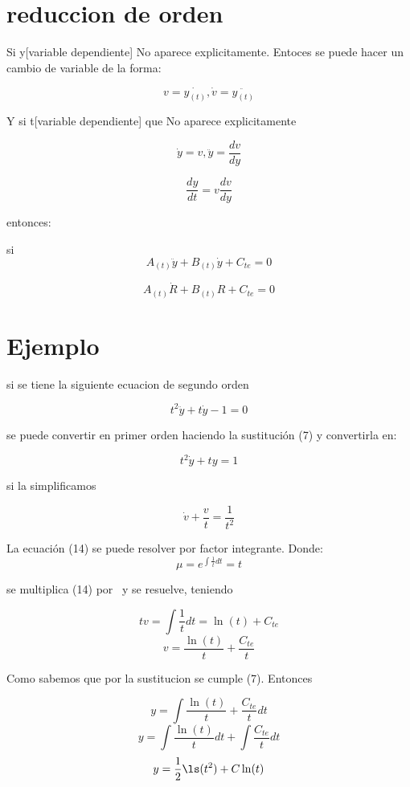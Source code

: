 \documentclass{article}
\begin{document}
\section{reduccion de orden}


Si y[variable dependiente] No aparece explicitamente. Entoces se puede hacer  un cambio de variable de la forma:

\begin{equation}
 v=\dot{y_{(t)}} , 
\dot{v}=\ddot{y_{(t)}}
\end{equation}

Y si t[variable dependiente] que No aparece explicitamente 

\begin{equation}
 \dot{y}=v,
 \ddot{y}=\frac{dv}{dy}
\end{equation}

\begin{equation}
 \frac{dy}{dt}=v\frac{dv}{dy}
\end{equation}


entonces:

si 
\begin{equation}
 A_{(t)}\ddot{y}+B_{(t)}\dot{y}+C_{te}=0
\end{equation}

\begin{equation}
 A_{(t)}\dot{R}+B_{(t)}{R}+C_{te}=0
\end{equation}


\section*{Ejemplo}

si  se  tiene la siguiente ecuacion de segundo orden

\begin{equation}
 t^{2}\ddot{y}+t\dot{y}-1=0
\end{equation}

se puede convertir en primer orden  haciendo la sustituci\'on (7) y  convertirla en:

\begin{equation}
 t^{2}\dot{y}+t{y}=1
\end{equation}
 
si la simplificamos 

\begin{equation}
 \dot{v}+ \frac{v}{t}=\frac{1}{t^{2}}
\end{equation}

La  ecuaci\'on (14) se  puede  resolver por  factor integrante. Donde: 
\[
\mu=e^{\int\frac{1}{t}dt}=t
 \]

se  multiplica (14) por \mu\  y se resuelve, teniendo 

\begin{equation}
 tv=\int\frac{1}{t}dt=\ln(t)+C_{te}
\end{equation}
\[
 v=\frac{\ln(t)}{t}+\frac{C_{te}}{t}
\]

Como sabemos que por la sustitucion se cumple (7). Entonces

\begin{equation}
 y=\int\frac{\ln(t)}{t}+\frac{C_{te}}{t}dt
\end{equation}
\[
 y=\int\frac{\ln(t)}{t}dt + \int\frac{C_{te}}{t}dt
\]
\[
 y=\frac{1}{2}\ls(t^{2})+C\ln(t)
\]
\end{document}
